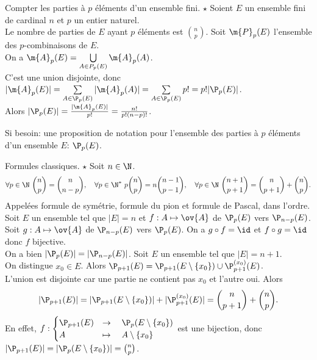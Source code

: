 \documentclass[11pt]{article}
\begin{document}
\begin{prop}{Compter les parties à $p$ éléments d'un ensemble fini. $\star$}{}
    Soient $E$ un ensemble fini de cardinal $n$ et $p$ un entier naturel.\\
    Le nombre de parties de $E$ ayant $p$ éléments est \Large$\binom{n}{p}$.
    \tcblower
    Soit $\m{P}_p(E)$ l'ensemble des $p$-combinaisons de $E$.\\
    On a $\m{A}_p(E)=\bigcup\limits_{A\in P_p(E)}\m{A}_p(A)$.\\
    C'est une union disjointe, donc $|\m{A}_p(E)|=\sum\limits_{A\in\P_p(E)}|\m{A}_p(A)|=\sum\limits_{A\in\P_p(E)}p!=p!|\P_p(E)|$.\\
    Alors $|\P_p(E)|=\frac{|\m{A}_p(E)|}{p!}=\frac{n!}{p!(n-p)!}$.
\end{prop}
Si besoin: une proposition de notation pour l'ensemble des parties à $p$ éléments d'un ensemble $E$: $\P_p(E)$.

\pagebreak
\begin{prop}{Formules classiques. $\star$}{}
    Soit $n\in\N$.
    \begin{equation*}
        \forall p\in\N~\binom{n}{p}=\binom{n}{n-p},\quad\forall p\in\N^*~p\binom{n}{p}=n\binom{n-1}{p-1},\quad\forall p\in\N~\binom{n+1}{p+1}=\binom{n}{p+1}+\binom{n}{p}.
    \end{equation*}
    Appelées formule de symétrie, formule du pion et formule de Pascal, dans l'ordre.
    \tcblower
     Soit $E$ un ensemble tel que $|E|=n$ et $f:A\mapsto\ov{A}$ de $\P_p(E)$ vers $\P_{n-p}(E)$.\\
    Soit $g:A\mapsto\ov{A}$ de $\P_{n-p}(E)$ vers $\P_p(E)$. On a $g\circ f=\id$ et $f\circ g=\id$ donc $f$ bijective.\\
    On a bien $|\P_p(E)|=|\P_{n-p}(E)|$.\n
     Soit $E$ un ensemble tel que $|E|=n+1$.\\
    On distingue $x_0\in E$. Alors $\P_{p+1}(E)=\P_{p+1}(E\setminus\{x_0\})\cup\P^{(x_0)}_{p+1}(E)$.\\
    L'union est disjointe car une partie ne contient pas $x_0$ et l'autre oui. Alors
    \begin{equation*}
        |\P_{p+1}(E)|=|\P_{p+1}(E\setminus\{x_0\})|+|\P_{p+1}^{(x_0)}(E)|=\binom{n}{p+1}+\binom{n}{p}.
    \end{equation*}
    En effet, $f:\begin{cases}
        \P_{p+1}(E)&\to\quad\P_{p}(E\setminus\{x_0\})\\
        A&\mapsto\quad A\setminus\{x_0\}
    \end{cases}$
    est une bijection, donc $|\P_{p+1}(E)|=|\P_{p}(E\setminus\{x_0\})|=\binom{n}{p}$.
\end{prop}
\end{document}
